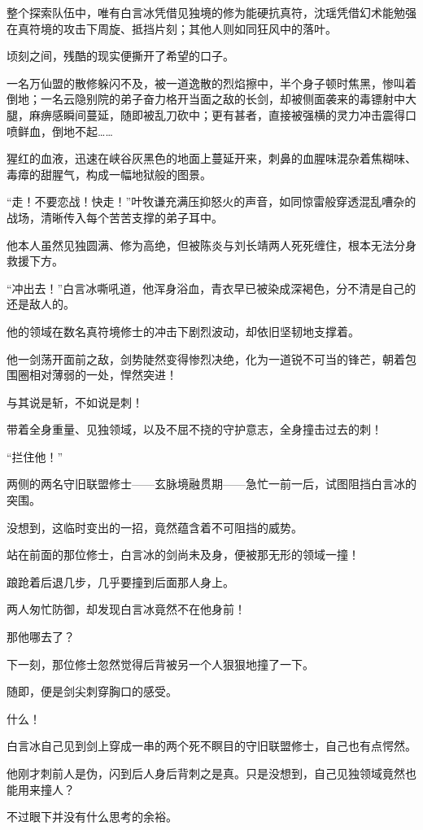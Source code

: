 整个探索队伍中，唯有白言冰凭借见独境的修为能硬抗真符，沈瑶凭借幻术能勉强在真符境的攻击下周旋、抵挡片刻；其他人则如同狂风中的落叶。

顷刻之间，残酷的现实便撕开了希望的口子。

一名万仙盟的散修躲闪不及，被一道逸散的烈焰擦中，半个身子顿时焦黑，惨叫着倒地；一名云隐别院的弟子奋力格开当面之敌的长剑，却被侧面袭来的毒镖射中大腿，麻痹感瞬间蔓延，随即被乱刀砍中；更有甚者，直接被强横的灵力冲击震得口喷鲜血，倒地不起……

猩红的血液，迅速在峡谷灰黑色的地面上蔓延开来，刺鼻的血腥味混杂着焦糊味、毒瘴的甜腥气，构成一幅地狱般的图景。

“走！不要恋战！快走！”叶牧谦充满压抑怒火的声音，如同惊雷般穿透混乱嘈杂的战场，清晰传入每个苦苦支撑的弟子耳中。

他本人虽然见独圆满、修为高绝，但被陈炎与刘长靖两人死死缠住，根本无法分身救援下方。

“冲出去！”白言冰嘶吼道，他浑身浴血，青衣早已被染成深褐色，分不清是自己的还是敌人的。

他的领域在数名真符境修士的冲击下剧烈波动，却依旧坚韧地支撑着。

他一剑荡开面前之敌，剑势陡然变得惨烈决绝，化为一道锐不可当的锋芒，朝着包围圈相对薄弱的一处，悍然突进！

与其说是斩，不如说是刺！

带着全身重量、见独领域，以及不屈不挠的守护意志，全身撞击过去的刺！

“拦住他！”

两侧的两名守旧联盟修士——玄脉境融贯期——急忙一前一后，试图阻挡白言冰的突围。

没想到，这临时变出的一招，竟然蕴含着不可阻挡的威势。

站在前面的那位修士，白言冰的剑尚未及身，便被那无形的领域一撞！

踉跄着后退几步，几乎要撞到后面那人身上。

两人匆忙防御，却发现白言冰竟然不在他身前！

那他哪去了？

下一刻，那位修士忽然觉得后背被另一个人狠狠地撞了一下。

随即，便是剑尖刺穿胸口的感受。

什么！

白言冰自己见到剑上穿成一串的两个死不瞑目的守旧联盟修士，自己也有点愕然。

他刚才刺前人是伪，闪到后人身后背刺之是真。只是没想到，自己见独领域竟然也能用来撞人？

不过眼下并没有什么思考的余裕。

